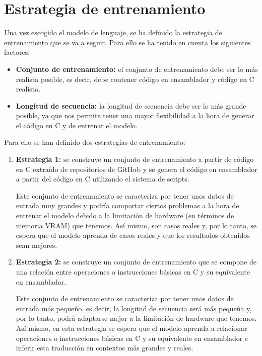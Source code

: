 \section{Estrategia de entrenamiento}
\label{sec:estrategia_entrenamiento}


Una vez escogido el modelo de lenguaje, se ha definido la estrategia de entrenamiento
que se va a seguir. Para ello se ha tenido en cuenta los siguientes factores:

\begin{itemize}
    \item \textbf{Conjunto de entrenamiento:} el conjunto de entrenamiento debe ser
        lo más realista posible, es decir, debe contener código en ensamblador y código
        en C realista.
    \item \textbf{Longitud de secuencia:} la longitud de secuencia debe ser lo más
        grande posible, ya que nos permite tener una mayor flexibilidad a la hora de
        generar el código en C y de entrenar el modelo.
\end{itemize}

Para ello se han definido dos estrategias de entrenamiento:

\begin{enumerate}
    \item \textbf{Estrategia 1:} se construye un conjunto de entrenamiento a partir
        de código en C extraído de repositorios de GitHub y se genera el código en
        ensamblador a partir del código en C utilizando el sistema de scripts.

        Este conjunto de entrenamiento se caracteriza por tener unos datos de entrada
        muy grandes y podría comportar ciertos problemas a la hora de entrenar el modelo
        debido a la limitación de hardware (en términos de memoria VRAM) que tenemos. Así
        mismo, son casos reales y, por lo tanto, se espera que el modelo aprenda de casos
        reales y que los resultados obtenidos sean mejores.

    \item \textbf{Estrategia 2:} se construye un conjunto de entrenamiento que se compone
        de una relación entre operaciones o instrucciones básicas en C y su equivalente
        en ensamblador.

        Este conjunto de entrenamiento se caracteriza por tener unos datos de entrada
        más pequeño, es decir, la longitud de secuencia será más pequeña y, por lo tanto,
        podrá adaptarse mejor a la limitación de hardware que tenemos. Así mismo, en esta 
        estrategia se espera que el modelo aprenda a relacionar operaciones o instrucciones
        básicas en C y su equivalente en ensamblador e inferir esta traducción en contextos más
        grandes y reales.
\end{enumerate}

